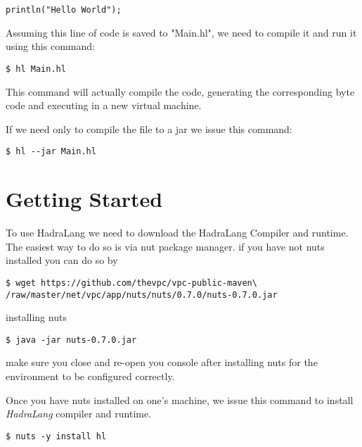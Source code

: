 \documentclass{tufte-book}
\begin{document}
        \begin{lstlisting}
println("Hello World");
        \end{lstlisting}
        
        Assuming this line of code is saved to "Main.hl", we need to compile it and run it using this command:
        \begin{lstlisting}
$ hl Main.hl
        \end{lstlisting}

        This command will actually compile the code, generating the corresponding byte code and executing in a new virtual machine.
        
        If we need only to compile the file to a jar we issue this command:

        \begin{lstlisting}
$ hl --jar Main.hl
        \end{lstlisting}

        \section*{Getting Started}
        To use HadraLang we need to download the HadraLang Compiler and runtime. The easiest way to do so is via 
        nut package manager.
        if you have not nuts installed you can do so by
        \begin{lstlisting}
$ wget https://github.com/thevpc/vpc-public-maven\
/raw/master/net/vpc/app/nuts/nuts/0.7.0/nuts-0.7.0.jar
        \end{lstlisting}
        
        installing nuts
        \begin{lstlisting}
$ java -jar nuts-0.7.0.jar
        \end{lstlisting}
        
        make sure you close and re-open you console after installing nuts for the environment to be configured correctly.
        
        Once you have nuts installed on one's machine, we issue this command to install \textit{HadraLang} compiler and runtime.

        \begin{lstlisting}
$ nuts -y install hl
        \end{lstlisting}
        
\end{document}
